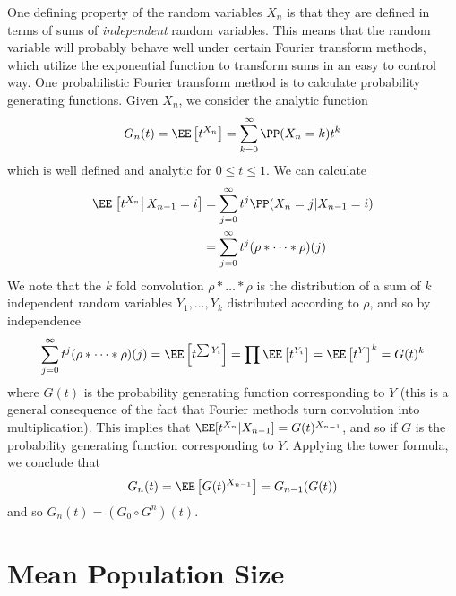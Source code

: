 One defining property of the random variables $X_n$ is that they are defined in terms of sums of {\it independent} random variables. This means that the random variable will probably behave well under certain Fourier transform methods, which utilize the exponential function to transform sums in an easy to control way. One probabilistic Fourier transform method is to calculate probability generating functions. Given $X_n$, we consider the analytic function
%
\[ G_n(t) = \EE \left[ t^{X_n} \right] = \sum_{k = 0}^\infty \PP(X_n = k) t^k \]
%
which is well defined and analytic for $0 \leq t \leq 1$. We can calculate
%
\begin{align*}
    \EE \left.\left[ t^{X_n} \right| X_{n-1} = i \right] &= \sum_{j = 0}^\infty t^j \PP(X_n = j | X_{n-1} = i)\\
    &= \sum_{j = 0}^\infty t^j (\rho * \dots * \rho)(j)
\end{align*}
%
We note that the $k$ fold convolution $\rho * \dots * \rho$ is the distribution of a sum of $k$ independent random variables $Y_1, \dots, Y_k$ distributed according to $\rho$, and so by independence
%
\[ \sum_{j = 0}^\infty t^j (\rho * \dots * \rho)(j) = \EE \left[ t^{\sum Y_i} \right] = \prod \EE \left[ t^{Y_i} \right] = \EE \left[ t^Y \right]^k = G(t)^k \]
%
where $G(t)$ is the probability generating function corresponding to $Y$ (this is a general consequence of the fact that Fourier methods turn convolution into multiplication). This implies that $\EE[t^{X_n}|X_{n-1}] = G(t)^{X_{n-1}}$, and so if $G$ is the probability generating function corresponding to $Y$. Applying the tower formula, we conclude that
%
\[ G_n(t) = \EE \left[ G(t)^{X_{n-1}} \right] = G_{n-1}(G(t)) \]
%
and so $G_n(t) = (G_0 \circ G^n)(t)$.

\section{Mean Population Size}

